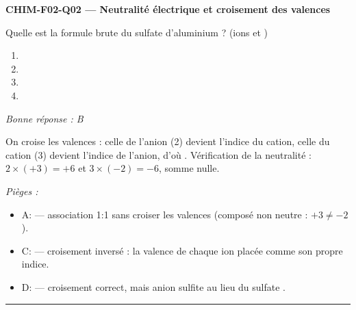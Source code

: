 \documentclass[11pt,a4paper]{article}
\begin{document}
\noindent\textbf{CHIM-F02-Q02 --- Neutralité électrique et croisement des valences}\par
Quelle est la formule brute du sulfate d'aluminium ? (ions  et )
\begin{enumerate}[label=\Alph*)]
\item {}
\item {}
\item {}
\item {}
\end{enumerate}
\textit{Bonne réponse : B}\par
On croise les valences : celle de l'anion (2) devient l'indice du cation, celle du cation (3) devient l'indice de l'anion, d'où . Vérification de la neutralité : $2\times(+3) = +6$ et $3\times(-2) = -6$, somme nulle.\par
\textit{Pièges :}
\begin{itemize}
\item A:  --- association 1:1 sans croiser les valences (composé non neutre : $+3 \neq -2$).
\item C:  --- croisement inversé : la valence de chaque ion placée comme son propre indice.
\item D:  --- croisement correct, mais anion sulfite  au lieu du sulfate .
\end{itemize}
\vspace{8pt}\hrule\vspace{8pt}
\end{document}
